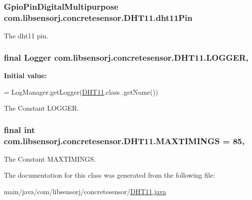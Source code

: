 \subsubsection[{dht11\+Pin}]{\setlength{\rightskip}{0pt plus 5cm}Gpio\+Pin\+Digital\+Multipurpose com.\+libsensorj.\+concretesensor.\+D\+H\+T11.\+dht11\+Pin\hspace{0.3cm}{\ttfamily [private]}}\label{classcom_1_1libsensorj_1_1concretesensor_1_1DHT11_a816e6c7ffc2d313077cc5df4b2252b41}
The dht11 pin. \hypertarget{classcom_1_1libsensorj_1_1concretesensor_1_1DHT11_ad5b8d7e0ad34e4f3b28c081f259d1928}{}
\subsubsection[{L\+O\+G\+G\+E\+R}]{\setlength{\rightskip}{0pt plus 5cm}final Logger com.\+libsensorj.\+concretesensor.\+D\+H\+T11.\+L\+O\+G\+G\+E\+R\hspace{0.3cm}{\ttfamily [static]}, {\ttfamily [private]}}\label{classcom_1_1libsensorj_1_1concretesensor_1_1DHT11_ad5b8d7e0ad34e4f3b28c081f259d1928}
{\bfseries Initial value\+:}
\begin{DoxyCode}
= LogManager.getLogger(\hyperlink{classcom_1_1libsensorj_1_1concretesensor_1_1DHT11_a6dee6dabad63a5b8f8ba35f1279703c2}{DHT11}.class
            .getName())
\end{DoxyCode}
The Constant L\+O\+G\+G\+E\+R. \hypertarget{classcom_1_1libsensorj_1_1concretesensor_1_1DHT11_ad986e37718b89038ff2702c80a2bb320}{}
\subsubsection[{M\+A\+X\+T\+I\+M\+I\+N\+G\+S}]{\setlength{\rightskip}{0pt plus 5cm}final int com.\+libsensorj.\+concretesensor.\+D\+H\+T11.\+M\+A\+X\+T\+I\+M\+I\+N\+G\+S = 85\hspace{0.3cm}{\ttfamily [static]}, {\ttfamily [private]}}\label{classcom_1_1libsensorj_1_1concretesensor_1_1DHT11_ad986e37718b89038ff2702c80a2bb320}
The Constant M\+A\+X\+T\+I\+M\+I\+N\+G\+S. 

The documentation for this class was generated from the following file\+:\begin{DoxyCompactItemize}
\item 
main/java/com/libsensorj/concretesensor/\hyperlink{DHT11_8java}{D\+H\+T11.\+java}\end{DoxyCompactItemize}

